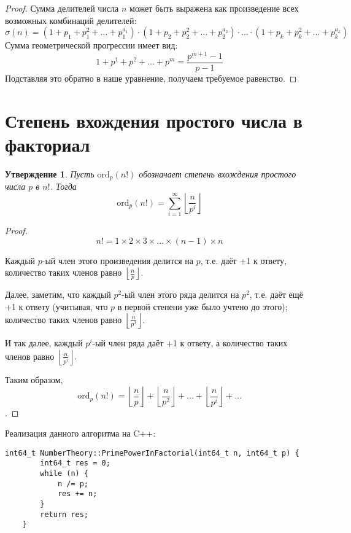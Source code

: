 \documentclass[12pt, a4paper, openany]{book}
\newtheorem*{statement}{Утверждение}
\begin{document}
\begin{proof}
    Сумма делителей числа \( n \) может быть выражена как произведение всех возможных комбинаций делителей:
    \[
    \sigma(n) = (1 + p_1 + p_1^2 + \ldots + p_1^{a_1}) \cdot (1 + p_2 + p_2^2 + \ldots + p_2^{a_2}) \cdot \ldots \cdot (1 + p_k + p_k^2 + \ldots + p_k^{a_k})
    \]
    \noindent
    Сумма геометрической прогрессии имеет вид:
    \[
    1 + p^1 + p^2 + \ldots + p^m = \frac{{p^{m+1} - 1}}{{p - 1}}
    \]
    \noindent
    Подставляя это обратно в наше уравнение, получаем требуемое равенство.
\end{proof}

\section{Степень вхождения простого числа в факториал}

\begin{statement}
    Пусть $\text{ord}_p(n!)$ обозначает степень вхождения простого числа $p$ в $n!$. Тогда
    \begin{equation}\text{ord}_p(n!) = \sum_{i=1}^{\infty} \left\lfloor \frac{n}{p^i} \right\rfloor\end{equation}
\end{statement}

\begin{proof}
    \[n! = 1 \times 2 \times 3 \times \ldots \times (n-1) \times n\]
    
    Каждый $p$-ый член этого произведения делится на $p$, т.е. даёт +1 к ответу, количество таких членов равно $\left\lfloor \frac{n}{p} \right\rfloor.$
    
    Далее, заметим, что каждый $p^2$-ый член этого ряда делится на $p^2$, т.е. даёт ещё +1 к ответу (учитывая, что $p$ в первой степени уже было учтено до этого); количество таких членов равно $\left\lfloor \frac{n}{p^2} \right\rfloor$.
    
    И так далее, каждый $p^i$-ый член ряда даёт +1 к ответу, а количество таких членов равно $\left\lfloor \frac{n}{p^i} \right\rfloor.$
    
    Таким образом, \[\text{ord}_p(n!) = \left\lfloor\frac{n}{p}\right\rfloor + \left\lfloor\frac{n}{p^2}\right\rfloor + \ldots + \left\lfloor\frac{n}{p^i}\right\rfloor + \ldots\].
\end{proof}

\newpage

\noindent
    Реализация данного алгоритма на C++:
\begin{lstlisting}[breaklines=true]
    int64_t NumberTheory::PrimePowerInFactorial(int64_t n, int64_t p) {
    	int64_t res = 0;
    	while (n) {
    		n /= p;
    		res += n;
    	}
    	return res;
    }
\end{lstlisting}
\end{document}
